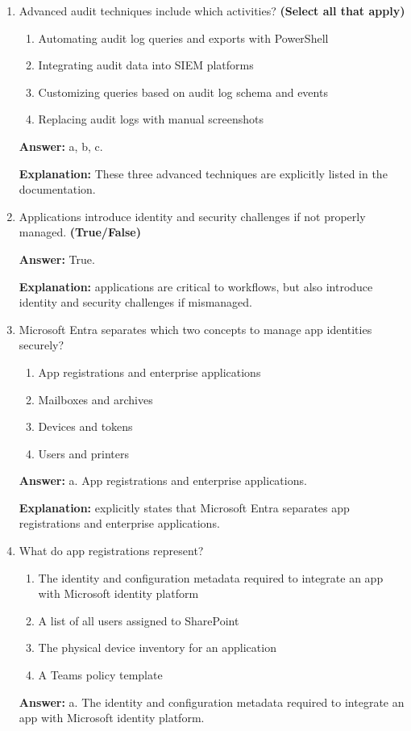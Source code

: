 \documentclass[10pt]{article}
\begin{document}
\begin{enumerate}[leftmargin=*]
\textbf{Explanation:} this auditing helps identify misconfigurations or unauthorized policy changes that might expose data or disrupt services.

\item Advanced audit techniques include which activities? \textbf{(Select all that apply)}
\begin{enumerate}[label=\alph*., leftmargin=1.5em]
\item Automating audit log queries and exports with PowerShell
\item Integrating audit data into SIEM platforms
\item Customizing queries based on audit log schema and events
\item Replacing audit logs with manual screenshots
\end{enumerate}
\textbf{Answer:} a, b, c.

\textbf{Explanation:} These three advanced techniques are explicitly listed in the documentation.

\item Applications introduce identity and security challenges if not properly managed. \textbf{(True/False)}

\textbf{Answer:} True.

\textbf{Explanation:} applications are critical to workflows, but also introduce identity and security challenges if mismanaged.

\item Microsoft Entra separates which two concepts to manage app identities securely?
\begin{enumerate}[label=\alph*., leftmargin=1.5em]
\item App registrations and enterprise applications
\item Mailboxes and archives
\item Devices and tokens
\item Users and printers
\end{enumerate}
\textbf{Answer:} a. App registrations and enterprise applications.

\textbf{Explanation:} explicitly states that Microsoft Entra separates app registrations and enterprise applications.

\item What do app registrations represent?
\begin{enumerate}[label=\alph*., leftmargin=1.5em]
\item The identity and configuration metadata required to integrate an app with Microsoft identity platform
\item A list of all users assigned to SharePoint
\item The physical device inventory for an application
\item A Teams policy template
\end{enumerate}
\textbf{Answer:} a. The identity and configuration metadata required to integrate an app with Microsoft identity platform.


\end{enumerate}
\end{document}
